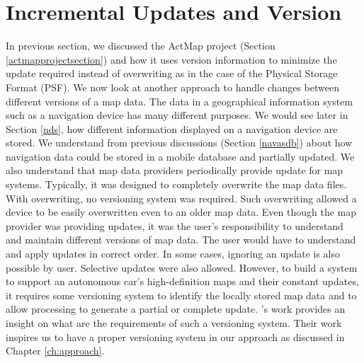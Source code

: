 \section{Incremental Updates and Version}\label{incrementalupdates}
In previous section, we discussed the ActMap project (Section \ref{actmapprojectsection}) and how it uses version information to minimize the update required instead of overwriting as in the case of the Physical Storage Format (PSF). We now look at another approach to handle changes between different versions of a map data. The data in a geographical information system such as a navigation device has many different purposes. We would see later in Section \ref{nds}, how different information displayed on a navigation device are stored. We understand from previous discussions (Section \ref{navasdb}) about how navigation data could be stored in a mobile database and partially updated. We also understand that map data providers periodically provide update for map systems. Typically, it was designed to completely overwrite the map data files. With overwriting, no versioning system was required. Such overwriting allowed a device to be easily overwritten even to an older map data. Even though the map provider was providing updates, it was the user's responsibility to understand and maintain different versions of map data. The user would have to understand and apply updates in correct order. In some cases, ignoring an update is also possible by user. Selective updates were also allowed. However, to build a system to support an autonomous car's high-definition maps and their constant updates, it requires some versioning system to identify the locally stored map data and to allow processing to generate a partial or complete update. \citet{cooper2001incremental}'s work provides an insight on what are the requirements of such a versioning system. Their work inspires us to have a proper versioning system in our approach as discussed in Chapter \ref{ch:approach}. \\

